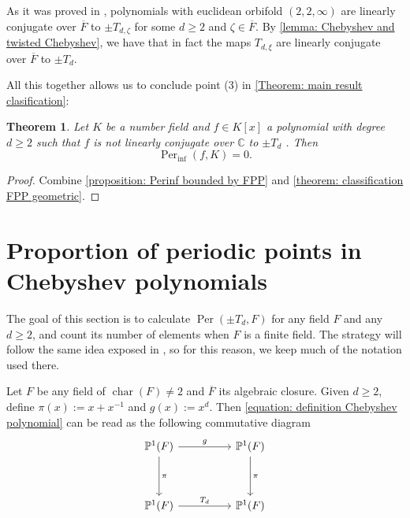 \documentclass{amsart}
\def\PP{\mathbb P}
\def\CC{\mathbb C}
\DeclareMathOperator{\Per}{Per}
\DeclareMathOperator{\car}{char}
\newtheorem{theorem}[proposition]{Theorem}
\theoremstyle{definition}
\begin{document}
As it was proved in \cite[Proposition 6.6]{FariñaRadi2026FPP}, polynomials with euclidean orbifold $(2,2,\infty)$ are linearly conjugate over $\overline{F}$ to $\pm T_{d, \zeta}$ for some $d \geq 2$ and $\zeta \in \overline{F}$. By \cref{lemma: Chebyshev and twisted Chebyshev}, we have that in fact the maps $T_{d,\xi}$ are linearly conjugate over $\overline{F}$ to $\pm T_d$. 

All this together allows us to conclude point (3) in \cref{Theorem: main result clasification}:

\begin{theorem}
Let $K$ be a number field and $f \in K[x]$ a polynomial with degree $d \geq 2$ such that $f$ is not linearly conjugate over $\CC$ to $\pm T_d$ . Then $$\Per_{\inf}(f,K) = 0.$$
\end{theorem}

\begin{proof}
Combine \cref{proposition: Perinf bounded by FPP} and \cref{theorem: classification FPP geometric}.
\end{proof}

\section{Proportion of periodic points in Chebyshev polynomials}
\label{section: Proportion of periodic points in Chebyshev polynomials}

The goal of this section is to calculate $\Per(\pm T_d, F)$ for any field $F$ and any $d \geq 2$, and count its number of elements when $F$ is a finite field. The strategy will follow the same idea exposed in \cite[Example 7.2]{Juul2014}, so for this reason, we keep much of the notation used there.

Let $F$ be any field of $\car(F) \neq 2$ and $\overline{F}$ its algebraic closure. Given $d \geq 2$, define $\pi(x) := x + x^{-1}$ and $g(x) := x^d$. Then \cref{equation: definition Chebyshev polynomial} can be read as the following commutative diagram
\begin{equation}
\centering
\begin{tikzcd}
\PP^1(F) \arrow{rr}{g} \arrow{dd}{\pi} & & \PP^1(F) \arrow{dd}{\pi} \\
 & & \\
\PP^1(F) \arrow{rr}{T_d} & & \PP^1(F) \\
\end{tikzcd}
\label{diagram: definition Td}
\end{equation}
\end{document}
